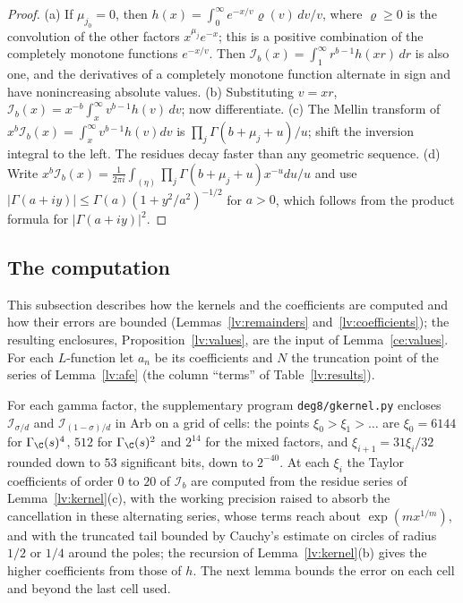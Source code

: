\begin{proof}
(a) If $\mu_{j_0}=0$, then $h(x)=\int_0^\infty e^{-x/v}\varrho(v)\,dv/v$, where
$\varrho\ge0$ is the convolution of the other factors $x^{\mu_j}e^{-x}$; this
is a positive combination of the completely monotone functions $e^{-x/v}$.
Then $\mathcal I_b(x)=\int_1^\infty r^{b-1}h(xr)\,dr$ is also one, and the
derivatives of a completely monotone function alternate in sign and have
nonincreasing absolute values.
(b) Substituting $v=xr$, $\mathcal I_b(x)=x^{-b}\int_x^\infty v^{b-1}h(v)\,dv$;
now differentiate.
(c) The Mellin transform of $x^b\mathcal I_b(x)=\int_x^\infty v^{b-1}h(v)dv$ is
$\prod_j\Gamma(b+\mu_j+u)/u$; shift the inversion integral to the left. The
residues decay faster than any geometric sequence.
(d) Write $x^b\mathcal I_b(x)=\frac1{2\pi i}\int_{(\eta)}\prod_j
\Gamma(b+\mu_j+u)x^{-u}du/u$ and use
$|\Gamma(a+iy)|\le\Gamma(a)(1+y^2/a^2)^{-1/2}$ for $a>0$, which follows from
the product formula for $|\Gamma(a+iy)|^2$.
\end{proof}

\subsection{The computation}\label{lv:computation}
This subsection describes how the kernels and the coefficients are computed
and how their errors are bounded (Lemmas~\ref{lv:remainders}
and~\ref{lv:coefficients}); the resulting enclosures,
Proposition~\ref{lv:values}, are the input of Lemma~\ref{ce:values}. For each
$L$-function let $a_n$ be its coefficients and $N$ the truncation point of
the series of Lemma~\ref{lv:afe} (the column ``terms'' of
Table~\ref{lv:results}).

For each gamma factor, the supplementary program \texttt{deg8/gkernel.py}
encloses $\mathcal I_{\sigma/d}$ and $\mathcal I_{(1-\sigma)/d}$ in Arb on a
grid of cells: the points $\xi_0>\xi_1>\dots$ are $\xi_0=6144$ for
$\Gamma_\C(s)^4$, $512$ for $\Gamma_\C(s)^2$ and $2^{14}$ for the mixed
factors, and $\xi_{i+1}=31\xi_i/32$ rounded down to $53$ significant bits, down to
$2^{-40}$. At each $\xi_i$ the Taylor coefficients of order $0$ to $20$ of
$\mathcal I_b$ are computed from the residue series of
Lemma~\ref{lv:kernel}(c), with the working precision raised to absorb the
cancellation in these alternating series, whose terms reach about
$\exp(m x^{1/m})$, and with the truncated tail bounded by Cauchy's estimate on
circles of radius $1/2$ or $1/4$ around the poles; the recursion of
Lemma~\ref{lv:kernel}(b) gives the higher coefficients from those of $h$. The
next lemma bounds the error on each cell and beyond the last cell used.

